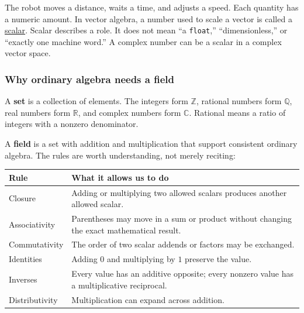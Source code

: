 The robot moves a distance, waits a time, and adjusts a speed. Each quantity has a numeric amount. In vector algebra, a number used to scale a vector is called a \hyperref[01-foundations-i-ch017-numbers-become-a-system-of-permitted-operations]{scalar}. Scalar describes a role. It does not mean ``a \texttt{float},'' ``dimensionless,'' or ``exactly one machine word.'' A complex number can be a scalar in a complex vector space.

\subsubsection{Why ordinary algebra needs a field}\label{01-foundations-i-ch017-why-ordinary-algebra-needs-a-field}

A \textbf{set} is a collection of elements. The integers form \(\mathbb Z\), rational numbers form \(\mathbb Q\), real numbers form \(\mathbb R\), and complex numbers form \(\mathbb C\). Rational means a ratio of integers with a nonzero denominator.

A \textbf{field} is a set with addition and multiplication that support consistent ordinary algebra. The rules are worth understanding, not merely reciting:

{\def\LTcaptype{none} %
\begin{longtable}[]{@{}
  >{\raggedright\arraybackslash}p{}
  >{\raggedright\arraybackslash}p{}@{}}
\toprule\noalign{}
\begin{minipage}[b]{\linewidth}\raggedright
Rule
\end{minipage} & \begin{minipage}[b]{\linewidth}\raggedright
What it allows us to do
\end{minipage} \\
\midrule\noalign{}
\endhead
\bottomrule\noalign{}
\endlastfoot
Closure & Adding or multiplying two allowed scalars produces another allowed scalar. \\
Associativity & Parentheses may move in a sum or product without changing the exact mathematical result. \\
Commutativity & The order of two scalar addends or factors may be exchanged. \\
Identities & Adding \(0\) and multiplying by \(1\) preserve the value. \\
Inverses & Every value has an additive opposite; every nonzero value has a multiplicative reciprocal. \\
Distributivity & Multiplication can expand across addition. \\
\end{longtable}
}

